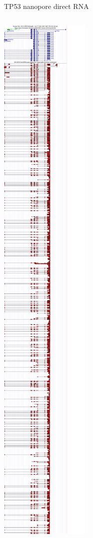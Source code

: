 \documentclass[10pt,
               hyperref={bookmarks=false,
                         bookmarksopen=false,
                         colorlinks=true,
                         linkcolor=blue,
                         urlcolor=blue},
               xcolor={svgnames,table}]{beamer}
\begin{document}
\begin{frame}{TP53 nanopore direct RNA}
  \vspace{1em}
  \begin{columns}
    \begin{column}{0.5\textwidth}
      \includegraphics[bb=0pt 0pt 429pt 814pt,clip,clip,scale=0.35]{images/tp53-direct-rna-1.pdf}

\end{column}
\end{columns}
\end{frame}
\end{document}
